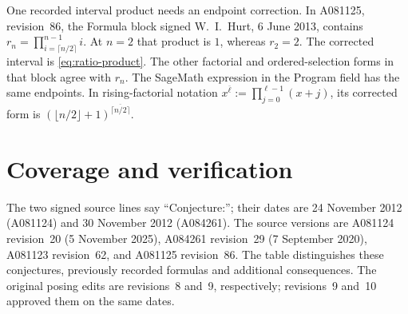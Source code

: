 \documentclass[11pt]{article}
\begin{document}
One recorded interval product needs an endpoint correction. In A081125,
revision~86, the Formula block signed W.~I.~Hurt, 6 June 2013, contains
$r_n=\prod_{i=\lceil n/2\rceil}^{n-1}i$. At $n=2$ that product is $1$,
whereas $r_2=2$. The corrected interval is
\eqref{eq:ratio-product}. The other factorial and ordered-selection
forms in that block agree with $r_n$.
The SageMath expression in the Program field has the same endpoints.
In rising-factorial notation $x^{\overline\ell}:=\prod_{j=0}^{\ell-1}(x+j)$,
its corrected form is
$(\lfloor n/2\rfloor+1)^{\overline{\lceil n/2\rceil}}$.

\section{Coverage and verification}
The two signed source lines say ``Conjecture:''; their dates are
24 November 2012 (A081124) and 30 November 2012 (A084261).
The source versions are A081124 revision~20 (5 November 2025),
A084261 revision~29 (7 September 2020), A081123 revision~62,
and A081125 revision~86. The table distinguishes these conjectures,
previously recorded formulas and additional consequences.
The original posing edits are revisions~8 and~9, respectively;
revisions~9 and~10 approved them on the same dates.
\small
\end{document}
